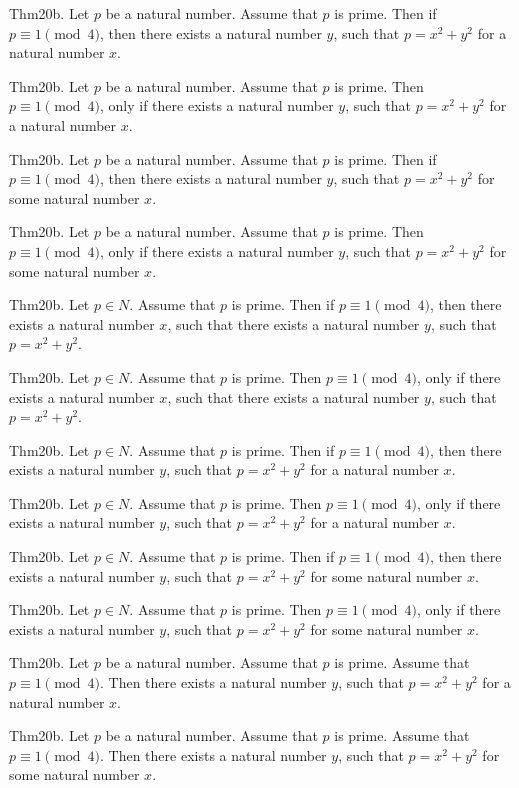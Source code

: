 \documentclass{article}
\begin{document}
Thm20b. Let $p$ be a natural number. Assume that $p$ is prime. Then if $p \equiv 1 \pmod{ 4}$, then there exists a natural number $y$, such that $p = x ^{ 2}+ y ^{ 2}$ for a natural number $x$.

Thm20b. Let $p$ be a natural number. Assume that $p$ is prime. Then $p \equiv 1 \pmod{ 4}$, only if there exists a natural number $y$, such that $p = x ^{ 2}+ y ^{ 2}$ for a natural number $x$.

Thm20b. Let $p$ be a natural number. Assume that $p$ is prime. Then if $p \equiv 1 \pmod{ 4}$, then there exists a natural number $y$, such that $p = x ^{ 2}+ y ^{ 2}$ for some natural number $x$.

Thm20b. Let $p$ be a natural number. Assume that $p$ is prime. Then $p \equiv 1 \pmod{ 4}$, only if there exists a natural number $y$, such that $p = x ^{ 2}+ y ^{ 2}$ for some natural number $x$.

Thm20b. Let $p \in N$. Assume that $p$ is prime. Then if $p \equiv 1 \pmod{ 4}$, then there exists a natural number $x$, such that there exists a natural number $y$, such that $p = x ^{ 2}+ y ^{ 2}$.

Thm20b. Let $p \in N$. Assume that $p$ is prime. Then $p \equiv 1 \pmod{ 4}$, only if there exists a natural number $x$, such that there exists a natural number $y$, such that $p = x ^{ 2}+ y ^{ 2}$.

Thm20b. Let $p \in N$. Assume that $p$ is prime. Then if $p \equiv 1 \pmod{ 4}$, then there exists a natural number $y$, such that $p = x ^{ 2}+ y ^{ 2}$ for a natural number $x$.

Thm20b. Let $p \in N$. Assume that $p$ is prime. Then $p \equiv 1 \pmod{ 4}$, only if there exists a natural number $y$, such that $p = x ^{ 2}+ y ^{ 2}$ for a natural number $x$.

Thm20b. Let $p \in N$. Assume that $p$ is prime. Then if $p \equiv 1 \pmod{ 4}$, then there exists a natural number $y$, such that $p = x ^{ 2}+ y ^{ 2}$ for some natural number $x$.

Thm20b. Let $p \in N$. Assume that $p$ is prime. Then $p \equiv 1 \pmod{ 4}$, only if there exists a natural number $y$, such that $p = x ^{ 2}+ y ^{ 2}$ for some natural number $x$.

Thm20b. Let $p$ be a natural number. Assume that $p$ is prime. Assume that $p \equiv 1 \pmod{ 4}$. Then there exists a natural number $y$, such that $p = x ^{ 2}+ y ^{ 2}$ for a natural number $x$.

Thm20b. Let $p$ be a natural number. Assume that $p$ is prime. Assume that $p \equiv 1 \pmod{ 4}$. Then there exists a natural number $y$, such that $p = x ^{ 2}+ y ^{ 2}$ for some natural number $x$.
\end{document}
